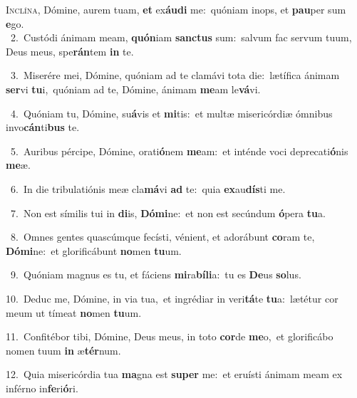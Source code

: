 \lettrine{\initial\textcolor{\initialcolor}{I}}{nclína,} Dómine, aurem tuam, \textbf{et} ex\-\textbf{áu}\-\textbf{di} me:~\star quóniam inops, et \textbf{pau}\-per sum \textbf{e}\-go.\\
{\numbfont\textcolor{\numbcolor}{~2.}}~Custódi ánimam meam, \textbf{quón}\-iam \textbf{sanc}\-\textbf{tus} sum:~\star salvum fac servum tuum, Deus meus, spe\-\textbf{rán}\-tem \textbf{in} te.\par
{\numbfont\textcolor{\numbcolor}{~3.}}~Miserére mei, Dómine, quóniam ad te clamávi tota die:~\dagger lætífica ánimam \textbf{ser}\-vi \textbf{tu}\-i,~\star quóniam ad te, Dómine, ánimam \textbf{me}\-am le\-\textbf{vá}\-vi.\par
{\numbfont\textcolor{\numbcolor}{~4.}}~Quóniam tu, Dómine, su\-\textbf{á}\-vis et \textbf{mi}\-tis:~\star et multæ misericórdiæ ómnibus invo\-\textbf{cán}\-ti\textbf{bus} te.\par
{\numbfont\textcolor{\numbcolor}{~5.}}~Auribus pércipe, Dómine, orati\-\textbf{ó}\-nem \textbf{me}\-am:~\star et inténde voci deprecati\-\textbf{ó}\-nis \textbf{me}\-æ.\par
{\numbfont\textcolor{\numbcolor}{~6.}}~In die tribulatiónis meæ cla\-\textbf{má}\-vi \textbf{ad} te:~\star quia \textbf{ex}\-au\-\textbf{dís}\-ti me.\par
{\numbfont\textcolor{\numbcolor}{~7.}}~Non est símilis tui in \textbf{di}\-is, \textbf{Dó}\-\textbf{mi}ne:~\star et non est secúndum \textbf{ó}\-pera \textbf{tu}\-a.\par
{\numbfont\textcolor{\numbcolor}{~8.}}~Omnes gentes quascúmque fecísti, vénient, et adorábunt \textbf{co}\-ram te, \textbf{Dó}\-\textbf{mi}ne:~\star et glorificábunt \textbf{no}\-men \textbf{tu}\-um.\par
{\numbfont\textcolor{\numbcolor}{~9.}}~Quóniam magnus es tu, et fáciens \textbf{mi}\-ra\-\textbf{bí}\-\textbf{li}a:~\star tu es \textbf{De}\-us \textbf{so}\-lus.\par
{\numbfont\textcolor{\numbcolor}{10.}}~Deduc me, Dómine, in via tua,~\dagger et ingrédiar in veri\-\textbf{tá}\-te \textbf{tu}\-a:~\star lætétur cor meum ut tímeat \textbf{no}\-men \textbf{tu}\-um.\par
{\numbfont\textcolor{\numbcolor}{11.}}~Confitébor tibi, Dómine, Deus meus, in toto \textbf{cor}\-de \textbf{me}\-o,~\star et glorificábo nomen tuum \textbf{in} æ\-\textbf{tér}\-num.\par
{\numbfont\textcolor{\numbcolor}{12.}}~Quia misericórdia tua \textbf{ma}\-gna est \textbf{su}\-\textbf{per} me:~\star et eruísti ánimam meam ex inférno in\-\textbf{fe}\-ri\-\textbf{ó}\-ri.\par
